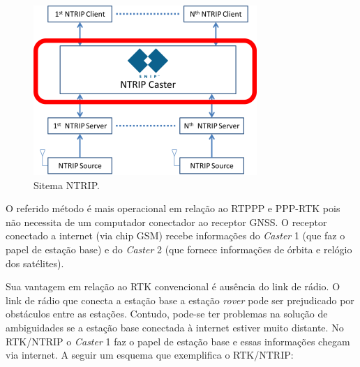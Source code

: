\begin{figure}[!htb]
\centering
\includegraphics[scale=2.0]{img/nnnnnnn.png} %
\caption{Sitema NTRIP. \citep{snip}}
\label{Rotulo}
\end{figure}


O referido método é mais operacional em relação ao RTPPP e PPP-RTK pois não necessita de um computador conectador ao receptor GNSS. O receptor conectado a internet (via chip GSM) recebe informações do \textit{Caster} 1 (que faz o papel de estação base) e do \textit{Caster} 2 (que fornece informações de órbita e relógio dos satélites).

Sua vantagem em relação ao RTK convencional é ausência do link de rádio. O link de rádio que conecta a estação base a estação \textit{rover} pode ser prejudicado por obstáculos entre as estações. Contudo, pode-se ter problemas na solução de ambiguidades se a estação base conectada à internet estiver muito distante. No RTK/NTRIP o \textit{Caster} 1 faz o papel de estação base e essas informações chegam via internet. A seguir um esquema que exemplifica o RTK/NTRIP:

